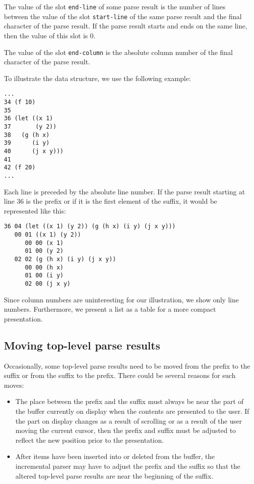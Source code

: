 The value of the slot \texttt{end-line} of some parse result is the
number of lines between the value of the slot \texttt{start-line} of
the same parse result and the final character of the parse result.
If the parse result starts and ends on the same line, then the value
of this slot is $0$.

The value of the slot \texttt{end-column} is the absolute column
number of the final character of the parse result.

To illustrate the data structure, we use the following example:

\begin{verbatim}
...
34 (f 10)
35
36 (let ((x 1)
37       (y 2))
38   (g (h x)
39      (i y)
40      (j x y)))
41
42 (f 20)
...
\end{verbatim}

Each line is preceded by the absolute line number.  If the parse
result starting at line 36 is the prefix or if it is the first element
of the suffix, it would be represented like this:

\begin{verbatim}
36 04 (let ((x 1) (y 2)) (g (h x) (i y) (j x y)))
   00 01 ((x 1) (y 2))
      00 00 (x 1)
      01 00 (y 2)
   02 02 (g (h x) (i y) (j x y))
      00 00 (h x)
      01 00 (i y)
      02 00 (j x y)
\end{verbatim}

Since column numbers are uninteresting for our illustration, we
show only line numbers.  Furthermore, we present a list as a table for
a more compact presentation.

\subsection{Moving top-level parse results}

Occasionally, some top-level parse results need to be moved from the
prefix to the suffix or from the suffix to the prefix.  There could be
several reasons for such moves:

\begin{itemize}
\item The place between the prefix and the suffix must always be near
  the part of the buffer currently on display when the contents are
  presented to the user.  If the part on display changes as a result
  of scrolling or as a result of the user moving the current cursor,
  then the prefix and suffix must be adjusted to reflect the new
  position prior to the presentation.
\item After items have been inserted into or deleted from the buffer,
  the incremental parser may have to adjust the prefix and the suffix
  so that the altered top-level parse results are near the beginning
  of the suffix.
\end{itemize}

